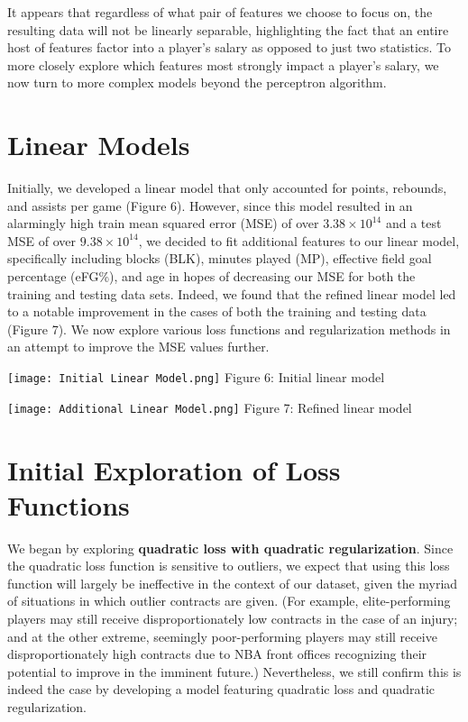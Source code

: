 \documentclass{article}
\begin{document}
It appears that regardless of what pair of features we choose to focus on, the resulting data will not be linearly separable, highlighting the fact that an entire host of features factor into a player's salary as opposed to just two statistics. To more closely explore which features most strongly impact a player's salary, we now turn to more complex models beyond the perceptron algorithm.


\section{Linear Models}
Initially, we developed a linear model that only accounted for points, rebounds, and assists per game (Figure 6). However, since this model resulted in an alarmingly high train mean squared error (MSE) of over $3.38\times{10^{14}}$ and a test MSE of over $9.38\times{10^{14}}$, we decided to fit additional features to our linear model, specifically including blocks (BLK), minutes played (MP), effective field goal percentage (eFG\%), and age in hopes of decreasing our MSE for both the training and testing data sets. Indeed, we found that the refined linear model led to a notable improvement in the cases of both the training and testing data (Figure 7). We now explore various loss functions and regularization methods in an attempt to improve the MSE values further.

\begin{minipage}[b]{0.4\textwidth}
    \texttt{[image: Initial Linear Model.png]}
    Figure 6: Initial linear model
  \end{minipage}
  \hfill
  \begin{minipage}[b]{0.4\textwidth}
    \texttt{[image: Additional Linear Model.png]}
    Figure 7: Refined linear model
  \end{minipage}


\section{Initial Exploration of Loss Functions}
We began by exploring \textbf{quadratic loss with quadratic regularization}. Since the quadratic loss function is sensitive to outliers, we expect that using this loss function will largely be ineffective in the context of our dataset, given the myriad of situations in which outlier contracts are given. (For example, elite-performing players may still receive disproportionately low contracts in the case of an injury; and at the other extreme, seemingly poor-performing players may still receive disproportionately high contracts due to NBA front offices recognizing their potential to improve in the imminent future.) Nevertheless, we still confirm this is indeed the case by developing a model featuring quadratic loss and quadratic regularization.
\end{document}
